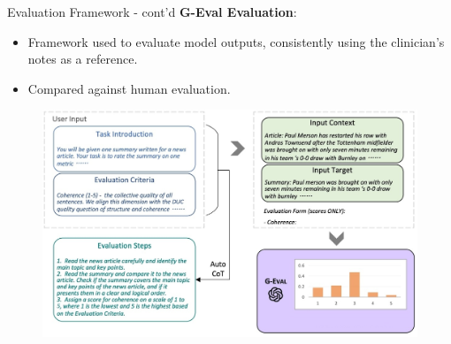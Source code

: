\documentclass[usenames,dvipsnames]{beamer}
\begin{document}
\begin{frame}{Evaluation Framework - cont'd}
  \textbf{G-Eval Evaluation}: 
  \begin{itemize}
    \item Framework used to evaluate model outputs, consistently using the clinician’s notes as a reference.
    \item Compared against human evaluation.
  \end{itemize}

  \begin{figure}[b]
    \includegraphics[scale=0.18]{images/G-Eval.jpg}
  \end{figure}

\end{frame}
\end{document}
